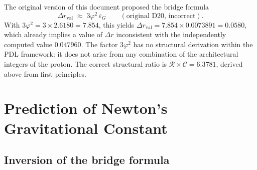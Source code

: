 \documentclass[11pt,a4paper]{article}
\begin{document}
The original version of this document \cite{Universal_Coherence_Leakage_2026} proposed the bridge formula
\begin{equation}
    \Delta r_{\mathrm{val}} 
    \;\approx\; 3\varphi^2\,\varepsilon_G 
    \qquad (\text{original D20, incorrect}).
    \label{eq:bridge_original_wrong}
\end{equation}
With $3\varphi^2 = 3 \times 2.6180 = 7.854$, this yields $\Delta r_{\mathrm{val}} = 7.854 \times 0.0073891 = 0.0580$, which already implies a value of $\Delta r$ inconsistent with the independently computed value $0.047960$. The factor $3\varphi^2$ has no structural derivation within the PDL framework: it does not arise from any combination of the architectural integers of the proton. The correct structural ratio is $\mathcal{R}\times\mathcal{C} = 6.3781$, derived above from first principles.


\section{Prediction of Newton's Gravitational Constant}
\label{sec:prediction}

\subsection{Inversion of the bridge formula}
\end{document}
